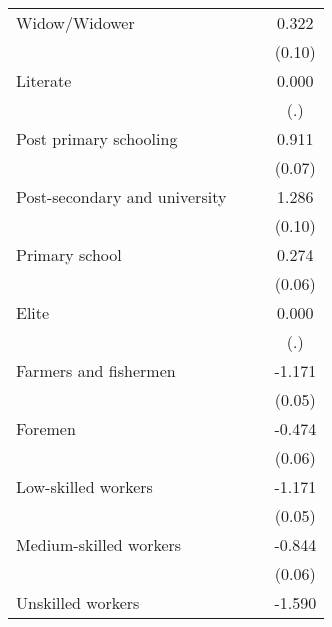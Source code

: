 {\begin{tabular}{l*{3}{c}}
Widow/Widower       &                     &                     &       0.322\sym{***}\\
                    &                     &                     &      (0.10)         \\
Literate            &                     &                     &       0.000         \\
                    &                     &                     &         (.)         \\
Post primary schooling&                     &                     &       0.911\sym{***}\\
                    &                     &                     &      (0.07)         \\
Post-secondary and university&                     &                     &       1.286\sym{***}\\
                    &                     &                     &      (0.10)         \\
Primary school      &                     &                     &       0.274\sym{***}\\
                    &                     &                     &      (0.06)         \\
Elite               &                     &                     &       0.000         \\
                    &                     &                     &         (.)         \\
Farmers and fishermen&                     &                     &      -1.171\sym{***}\\
                    &                     &                     &      (0.05)         \\
Foremen             &                     &                     &      -0.474\sym{***}\\
                    &                     &                     &      (0.06)         \\
Low-skilled workers &                     &                     &      -1.171\sym{***}\\
                    &                     &                     &      (0.05)         \\
Medium-skilled workers&                     &                     &      -0.844\sym{***}\\
                    &                     &                     &      (0.06)         \\
Unskilled workers   &                     &                     &      -1.590\sym{***}\\

\end{tabular}}

